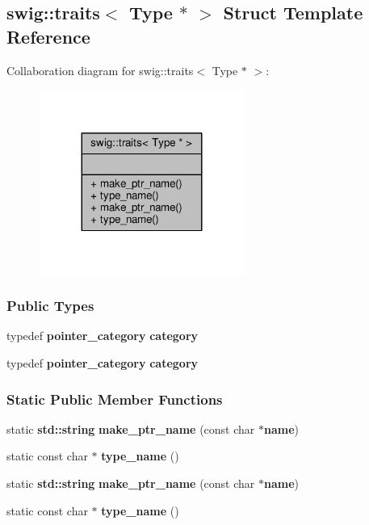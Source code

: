 \subsection{swig\+:\+:traits$<$ Type $\ast$ $>$ Struct Template Reference}
\label{structswig_1_1traits_3_01Type_01_5_01_4}


Collaboration diagram for swig\+:\+:traits$<$ Type $\ast$ $>$\+:
\nopagebreak
\begin{figure}[H]
\begin{center}
\leavevmode
\includegraphics[width=191pt]{d0/d34/structswig_1_1traits_3_01Type_01_5_01_4__coll__graph}
\end{center}
\end{figure}
\subsubsection*{Public Types}
\begin{DoxyCompactItemize}
\item 
typedef {\bf pointer\+\_\+category} {\bf category}
\item 
typedef {\bf pointer\+\_\+category} {\bf category}
\end{DoxyCompactItemize}
\subsubsection*{Static Public Member Functions}
\begin{DoxyCompactItemize}
\item 
static {\bf std\+::string} {\bf make\+\_\+ptr\+\_\+name} (const char $\ast${\bf name})
\item 
static const char $\ast$ {\bf type\+\_\+name} ()
\item 
static {\bf std\+::string} {\bf make\+\_\+ptr\+\_\+name} (const char $\ast${\bf name})
\item 
static const char $\ast$ {\bf type\+\_\+name} ()
\end{DoxyCompactItemize}


